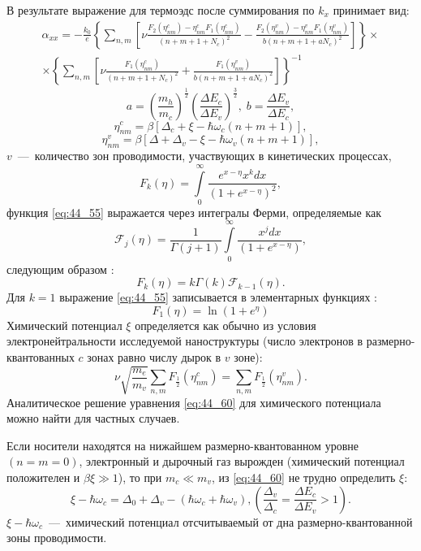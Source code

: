 В результате выражение для термоэдс после суммирования по $k_x $ принимает вид:
\begin{multline} \label{eq:44_50}
	\alpha _{xx} =-\frac{k_0}{e} \left\{\sum_{n,m}\left[\nu \frac{F_2 \left(\eta_{nm}^c \right)-\eta _{nm}^c F_1 \left(\eta_{nm}^c \right)}{\left(n+m+1+N_c \right)^2 } -\frac{F_2 \left(\eta_{nm}^v \right)-\eta_{nm}^v F_1 \left(\eta_{nm}^v \right)}{b\left(n+m+1+aN_c \right)^2 } \right] \right\}\times\\
	\times \left\{\sum _{n,m}\left[\nu \frac{F_1 \left(\eta_{nm}^c \right)}{\left(n+m+1+N_c \right)^2 } +\frac{F_1 \left(\eta_{nm}^v \right)}{b\left(n+m+1+a N_c \right)^2 } \right] \right\}^{-1}
\end{multline}
\[
	a=\left(\frac{m_h }{m_c } \right)^{\frac{1}{2} } \left(\frac{\Delta E_c }{\Delta E_v } \right)^{\frac{3}{2} } ,\;
	b=\frac{\Delta E_v }{\Delta E_c } ,
\]
\[
	\eta_{nm}^c =\beta \left[\Delta_c +\xi -\hbar \omega_c \left(n+m+1\right)\right],
\]
\[
	\eta_{nm}^v =\beta \left[\Delta +\Delta_v -\xi -\hbar \omega_v \left(n+m+1\right)\right],
\]
$v$~---~количество зон проводимости, участвующих в кинетических процессах,
\begin{equation} \label{eq:44_55}
	F_k (\eta )=\int\limits_0^{\infty }{\frac{ e^{x-\eta } x^k dx}{\left(1 + e^{x-\eta }\right)^2 }} ,
\end{equation}
функция \eqref{eq:44_55} выражается через интегралы Ферми, определяемые как \cite{Dingle1957,Blakemore1982}
\[
	\mathcal{F}_j (\eta )=\frac{1}{\Gamma(j+1)}\int\limits_0^{\infty }{\frac{x^j dx}{\left(1 + e^{x-\eta }\right) }} ,
\]
следующим образом \cite{Askerov1970}:
\[
	F_k (\eta ) =k \Gamma(k) \mathcal{F}_{k-1} (\eta ).
\]
Для $k=1$ выражение \eqref{eq:44_55} записывается в элементарных функциях \cite{Rhodes1950}:
\[
	F_1 (\eta )=\ln \left(1 + e^{\eta }\right)
\]
Химический потенциал $\xi $ определяется как обычно из условия электронейтральности исследуемой наноструктуры (число электронов в размерно-квантованных $c$ зонах равно числу дырок в $v$ зоне):
\begin{equation} \label{eq:44_60}
	\nu \sqrt{\frac{m_e }{m_v } } \sum_{n,m}F_{\frac{1}{2}}\left(\eta_{nm}^c \right) =\sum_{n,m}F_{ \frac{1}{2}} \left(\eta_{nm}^v \right) .
\end{equation}
Аналитическое решение уравнения \eqref{eq:44_60} для химического потенциала можно найти для частных случаев.

Если носители находятся на нижайшем размерно-квантованном уровне $(n=m=0)$, электронный и дырочный газ вырожден (химический потенциал положителен и $\beta \xi \gg 1$), то при $m_c \ll m_v $, из \eqref{eq:44_60} не трудно определить $\xi $:
\[
	\xi -\hbar \omega_c =\Delta_0 +\Delta_v -\left(\hbar \omega_c +\hbar \omega_v \right), \left(\frac{\Delta_v }{\Delta_c } =\frac{\Delta E_c }{\Delta E_v } >1\right).
\]
$\xi -\hbar \omega_c $~---~химический потенциал отсчитываемый от дна размерно-квантованной зоны проводимости.

